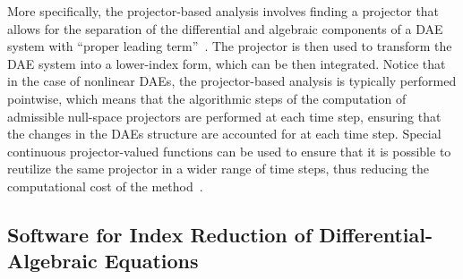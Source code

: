 More specifically, the projector-based analysis involves finding a projector that allows for the separation of the differential and algebraic components of a \ac{DAE} system with ``proper leading term''~\cite{lamour2011computational}. The projector is then used to transform the \ac{DAE} system into a lower-index form, which can be then integrated. Notice that in the case of nonlinear \acp{DAE}, the projector-based analysis is typically performed pointwise, which means that the algorithmic steps of the computation of admissible null-space projectors are performed at each time step, ensuring that the changes in the \acp{DAE} structure are accounted for at each time step. Special continuous projector-valued functions can be used to ensure that it is possible to reutilize the same projector in a wider range of time steps, thus reducing the computational cost of the method~\cite{lamour2012detecting}.

\subsection{Software for Index Reduction of Differential-Algebraic Equations}

